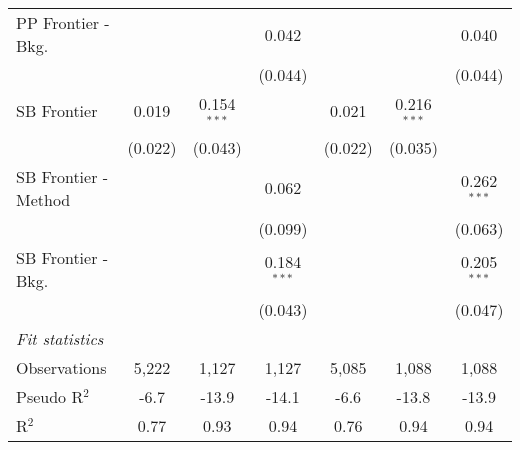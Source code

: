 \begin{tabular}{lcccccc}
   PP Frontier - Bkg.   &                &               & 0.042         &                &               & 0.040\\   
                        &                &               & (0.044)       &                &               & (0.044)\\   
   SB Frontier          & 0.019          & 0.154$^{***}$ &               & 0.021          & 0.216$^{***}$ &   \\   
                        & (0.022)        & (0.043)       &               & (0.022)        & (0.035)       &   \\   
   SB Frontier - Method &                &               & 0.062         &                &               & 0.262$^{***}$\\   
                        &                &               & (0.099)       &                &               & (0.063)\\   
   SB Frontier - Bkg.   &                &               & 0.184$^{***}$ &                &               & 0.205$^{***}$\\   
                        &                &               & (0.043)       &                &               & (0.047)\\   
   \midrule
   \emph{Fit statistics}\\
   Observations         & 5,222          & 1,127         & 1,127         & 5,085          & 1,088         & 1,088\\  
   Pseudo R$^2$         & -6.7           & -13.9         & -14.1         & -6.6           & -13.8         & -13.9\\  
   R$^2$                & 0.77           & 0.93          & 0.94          & 0.76           & 0.94          & 0.94\\  
   

\end{tabular}
